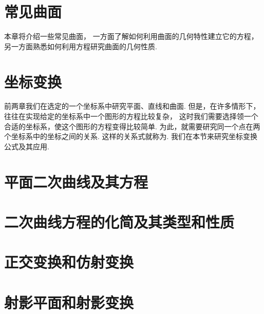 \chapter{常见曲面}
本章将介绍一些常见曲面，
一方面了解如何利用曲面的几何特性建立它的方程，
另一方面熟悉如何利用方程研究曲面的几何性质.







\chapter{坐标变换}
前两章我们在选定的一个坐标系中研究平面、直线和曲面.
但是，在许多情形下，往往在实现给定的坐标系中一个图形的方程比较复杂，
这时我们需要选择领一个合适的坐标系，使这个图形的方程变得比较简单.
为此，就需要研究同一个点在两个坐标系中的坐标之间的关系.
这样的关系式就称为.
我们在本节来研究坐标变换公式及其应用.







\chapter{平面二次曲线及其方程}





\chapter{二次曲线方程的化简及其类型和性质}







\chapter{正交变换和仿射变换}






\chapter{射影平面和射影变换}

% 
